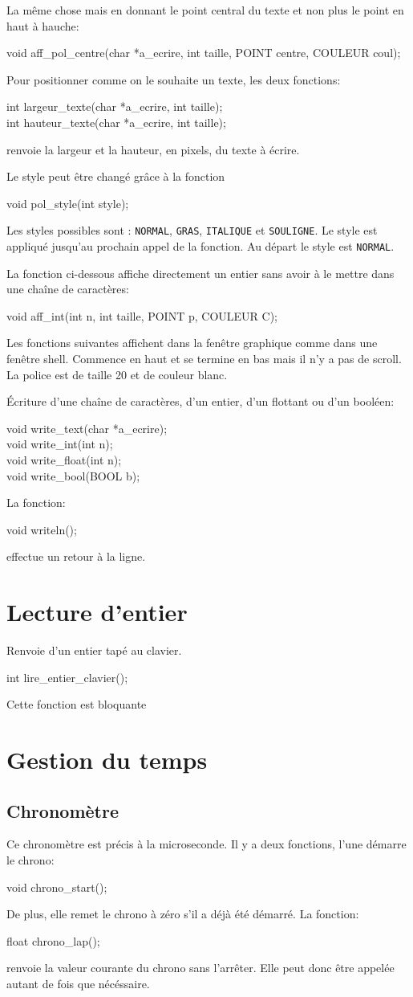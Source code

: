 \documentclass{article}
\newcommand\code[1]{
\begin{mdframed}[linecolor=purple,backgroundcolor=blue!10]
{\tt
#1
}
\end{mdframed}
}
\begin{document}
La même chose mais en donnant le point central du texte et non plus
le point en haut à hauche:
\code{
void aff\_pol\_centre(char *a\_ecrire, int taille, POINT centre, COULEUR coul);
}

Pour positionner comme on le souhaite un texte, les deux fonctions:
\code{
int largeur\_texte(char *a\_ecrire, int taille);\\
int hauteur\_texte(char *a\_ecrire, int taille);
}
renvoie la largeur et la hauteur, en pixels, du texte à écrire.

Le style peut être changé grâce à la fonction
\code{
void pol\_style(int style);
}
Les styles possibles sont : \texttt{NORMAL}, \texttt{GRAS}, \texttt{ITALIQUE} et 
\texttt{SOULIGNE}. Le style est appliqué jusqu'au prochain appel de la fonction.
Au départ le style est \texttt{NORMAL}.

La fonction ci-dessous affiche directement un entier sans avoir 
à le mettre dans une chaîne de caractères:
\code{
void aff\_int(int n, int taille, POINT p, COULEUR C);
}

Les fonctions suivantes affichent dans la fenêtre graphique comme dans 
une fenêtre shell. Commence en haut et se termine en bas mais il n'y a
pas de scroll. La police est de taille 20 et de couleur blanc.

\'Ecriture d'une chaîne de caractères, d'un entier, d'un flottant ou d'un booléen:
\code{
void write\_text(char *a\_ecrire);\\
void write\_int(int n);\\
void write\_float(int n);\\
void write\_bool(BOOL b);
}

La fonction:
\code{
void writeln();
}
effectue un retour à la ligne.

\section{Lecture d'entier}
Renvoie d'un entier tapé au clavier. 
\code{
int lire\_entier\_clavier();
}
Cette fonction est bloquante


\section{Gestion du temps}

\subsection{Chronomètre}
Ce chronomètre est précis à la microseconde.
Il y a deux fonctions, l'une démarre le chrono:
\code{
void chrono\_start();
}
De plus, elle remet le chrono à zéro s'il a déjà été démarré.
La fonction:
\code{
float chrono\_lap();
}
renvoie la valeur courante du chrono sans l'arrêter.
Elle peut donc être appelée autant de fois que nécéssaire.
\end{document}
